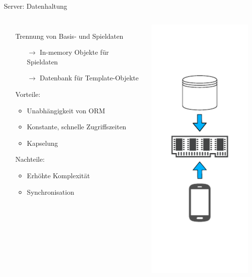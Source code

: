 \begin{frame}{Server: Datenhaltung}
	\begin{columns}
			\begin{itemize}
				\itemsep 12pt
				\item[] Trennung von Basis- und Spieldaten
				\begin{itemize}
					\itemsep 2pt
					\item[$\rightarrow$] In-memory Objekte für Spieldaten
					\item[$\rightarrow$] Datenbank für Template-Objekte   
				\end{itemize}
				\item[] Vorteile:
				\begin{itemize}
					\itemsep 2pt
					\item Unabhängigkeit von ORM
					\item Konstante, schnelle Zugriffszeiten
					\item Kapselung
				\end{itemize}
				\item[] Nachteile:
				\begin{itemize}
					\itemsep 2pt
					\item Erhöhte Komplexität
					\item Synchronisation
				\end{itemize}
			\end{itemize}
			\includegraphics[height=\textheight]{images/server/datenhaltung.pdf}
	\end{columns} 
\end{frame}


